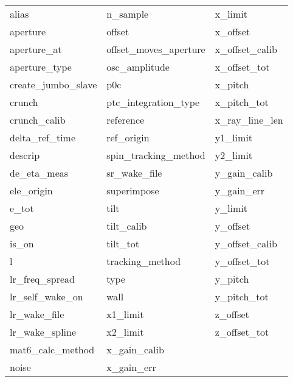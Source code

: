  \begin{tabular}{lll} \toprule
alias                       & n_sample                    & x_limit                     \\
aperture                    & offset                      & x_offset                    \\
aperture_at                 & offset_moves_aperture       & x_offset_calib              \\
aperture_type               & osc_amplitude               & x_offset_tot                \\
create_jumbo_slave          & p0c                         & x_pitch                     \\
crunch                      & ptc_integration_type        & x_pitch_tot                 \\
crunch_calib                & reference                   & x_ray_line_len              \\
delta_ref_time              & ref_origin                  & y1_limit                    \\
descrip                     & spin_tracking_method        & y2_limit                    \\
de_eta_meas                 & sr_wake_file                & y_gain_calib                \\
ele_origin                  & superimpose                 & y_gain_err                  \\
e_tot                       & tilt                        & y_limit                     \\
geo                         & tilt_calib                  & y_offset                    \\
is_on                       & tilt_tot                    & y_offset_calib              \\
l                           & tracking_method             & y_offset_tot                \\
lr_freq_spread              & type                        & y_pitch                     \\
lr_self_wake_on             & wall                        & y_pitch_tot                 \\
lr_wake_file                & x1_limit                    & z_offset                    \\
lr_wake_spline              & x2_limit                    & z_offset_tot                \\
mat6_calc_method            & x_gain_calib                &                             \\
noise                       & x_gain_err                  &                             \\
 \bottomrule
 \end{tabular}
 \vfill
 
